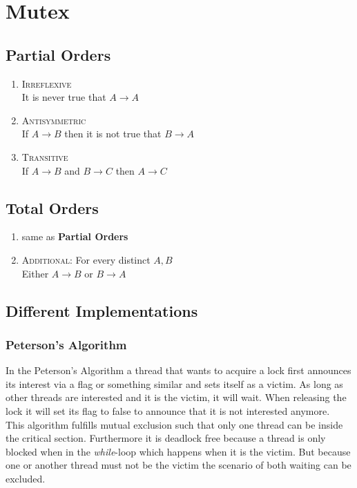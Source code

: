 \documentclass{article}
\begin{document}
	\section{Mutex}
	\begin{adjustwidth}{2em}{2em}
		\subsection{Partial Orders}
		\begin{adjustwidth}{2em}{2em}
			\begin{enumerate}[-]
				\item \textsc{Irreflexive} \\
				It is never true that $A \rightarrow A$
				\item \textsc{Antisymmetric} \\
				If $A \rightarrow B$ then it is not true that $B \rightarrow A$
				\item \textsc{Transitive} \\
				If $A \rightarrow B$ and $B \rightarrow C$ then $A \rightarrow C$
			\end{enumerate}
		\end{adjustwidth}
		\subsection{Total Orders}
		\begin{adjustwidth}{2em}{2em}
			\begin{enumerate}[-]
				\item same as \textbf{Partial Orders}
				\item \textsc{Additional:} For every distinct $A, B$ \\
				Either $A \rightarrow B$ or $B \rightarrow A$
			\end{enumerate}
		\end{adjustwidth}
		\subsection{Different Implementations}
		\begin{adjustwidth}{2em}{2em}
			\subsubsection{Peterson's Algorithm}
			\begin{adjustwidth}{1em}{}
				In the Peterson's Algorithm a thread that wants to acquire a lock first announces its interest via a flag or something similar and sets itself as a victim. As long as other threads are interested and it is the victim, it will wait. When releasing the lock it will set its flag to false to announce that it is not interested anymore. \\
				This algorithm fulfills mutual exclusion such that only one thread can be inside the critical section. Furthermore it is deadlock free because a thread is only blocked when in the \textit{while}-loop which happens when it is the victim. But because one or another thread must not be the victim the scenario of both waiting can be excluded.
			\end{adjustwidth}

\end{adjustwidth}
\end{adjustwidth}
\end{document}
